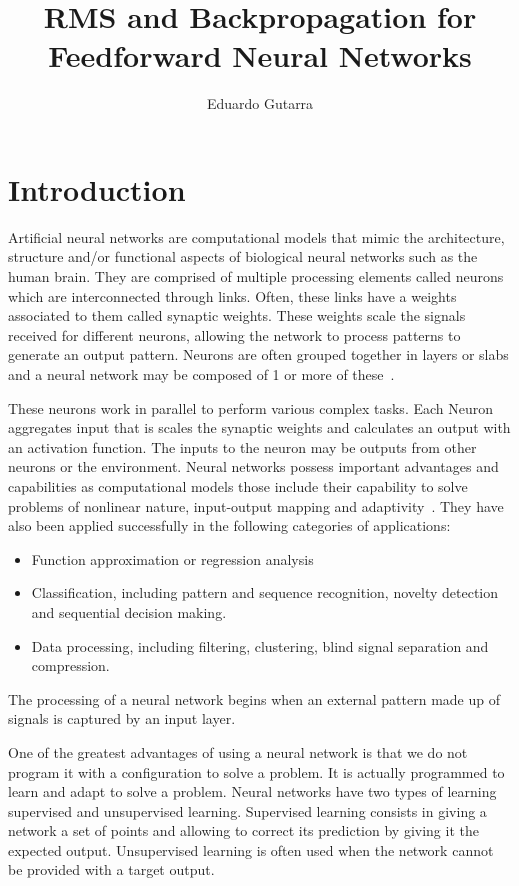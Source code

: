 \documentclass[11pt]{article}
\title{RMS and Backpropagation for Feedforward Neural Networks}
\author{Eduardo Gutarra}
\begin{document}
	
\ifpdf
{}
\else
{}
\fi
	
\maketitle
	
\section{Introduction} %
\label{sec:introduction}

Artificial neural networks are computational models that mimic the architecture, structure and/or functional aspects of biological
neural networks such as the human brain. They are comprised of multiple processing elements called neurons which are interconnected
through links. Often, these links have a weights associated to them called synaptic weights. These weights scale the signals received
for different neurons, allowing the network to process patterns to generate an output pattern. Neurons are often grouped together in
layers or slabs and a neural network may be composed of 1 or more of these~\cite{skapura}.

These neurons work in parallel to perform various complex tasks. Each Neuron aggregates input that is scales the synaptic weights and
calculates an output with an activation function. The inputs to the neuron may be outputs from other neurons or the environment. Neural
networks possess important advantages and capabilities as computational models those include their capability to solve problems of
nonlinear nature, input-output mapping and adaptivity~\cite{Haykin:1994:NNC:541500}. They have also been applied successfully in the
following categories of applications:

\begin{itemize}
\item Function approximation or regression analysis
\item Classification, including pattern and sequence recognition, novelty detection and sequential decision making.
\item Data processing, including filtering, clustering, blind signal separation and compression.
\end{itemize}

The processing of a neural network begins when an external pattern made up of signals is captured by an input layer.

One of the greatest advantages of using a neural network is that we do not program it with a configuration to solve a problem. It is
actually programmed to learn and adapt to solve a problem. Neural networks have two types of learning supervised and unsupervised
learning. Supervised learning consists in giving a network a set of points and allowing to correct its prediction by giving it the
expected output. Unsupervised learning is often used when the network cannot be provided with a target output.
\end{document}
